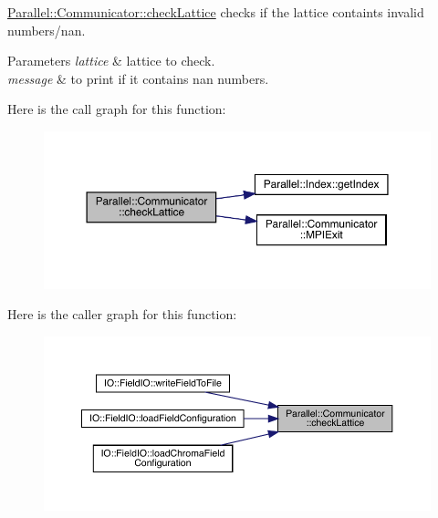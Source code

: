 \mbox{\hyperlink{class_parallel_1_1_communicator_a9471bf9448f34a0b4575310a3c54af61}{Parallel\+::\+Communicator\+::check\+Lattice}} checks if the lattice containts invalid numbers/nan. 


\begin{DoxyParams}{Parameters}
{\em lattice} & lattice to check. \\
\hline
{\em message} & to print if it contains nan numbers. \\
\hline
\end{DoxyParams}
Here is the call graph for this function\+:\nopagebreak
\begin{figure}[H]
\begin{center}
\leavevmode
\includegraphics[width=350pt]{class_parallel_1_1_communicator_a9471bf9448f34a0b4575310a3c54af61_cgraph}
\end{center}
\end{figure}
Here is the caller graph for this function\+:\nopagebreak
\begin{figure}[H]
\begin{center}
\leavevmode
\includegraphics[width=350pt]{class_parallel_1_1_communicator_a9471bf9448f34a0b4575310a3c54af61_icgraph}
\end{center}
\end{figure}
\mbox{\label{class_parallel_1_1_communicator_acd7e2f114728e5207093743a58ab3a40}} 
